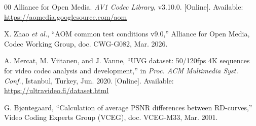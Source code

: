 \documentclass[conference]{IEEEtran}
\begin{document}
\begin{thebibliography}{00}
 Alliance for Open Media. \emph{AV1 Codec Library}, v3.10.0. [Online]. Available: \url{https://aomedia.googlesource.com/aom}

 X. Zhao \emph{et al.}, ``AOM common test conditions v9.0,'' Alliance for Open Media, Codec Working Group, doc. CWG-G082, Mar. 2026.

 A. Mercat, M. Viitanen, and J. Vanne, ``UVG dataset: 50/120fps 4K sequences for video codec analysis and development,'' in \emph{Proc. ACM Multimedia Syst. Conf.}, Istanbul, Turkey, Jun. 2020. [Online]. Available: \url{https://ultravideo.fi/dataset.html}

 G. Bj{\o}ntegaard, ``Calculation of average PSNR differences between RD-curves,'' Video Coding Experts Group (VCEG), doc. VCEG-M33, Mar. 2001.

\end{thebibliography}
\end{document}

